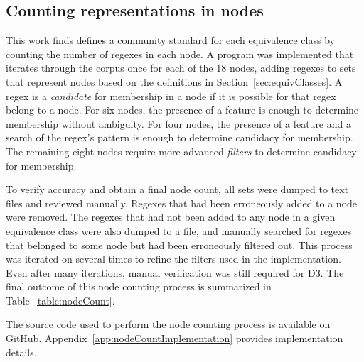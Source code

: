 \subsection{Counting representations in nodes}
\label{sec:nodeCountOverview}

This work finds defines a community standard for each equivalence class by counting the number of regexes in each node.  A program was implemented that iterates through the corpus once for each of the 18 nodes, adding regexes to sets that represent nodes based on the definitions in Section~\ref{sec:equivClasses}.  A regex is a \emph{candidate} for membership in a node if it is possible for that regex belong to a node.  For six nodes, the presence of a feature is enough to determine membership without ambiguity.  For four nodes, the presence of a feature and a search of the regex's pattern is enough to determine candidacy for membership.  The remaining eight nodes require more advanced \emph{filters} to determine candidacy for membership.

To verify accuracy and obtain a final node count, all sets were dumped to text files and reviewed manually. Regexes that had been erroneously added to a node were removed.  The regexes that had not been added to any node in a given equivalence class were also dumped to a file, and manually searched for regexes that belonged to some node but had been erroneously filtered out.  This process was iterated on several times to refine the filters used in the implementation.  Even after many iterations, manual verification was still required for D3. The final outcome of this node counting process is summarized in Table~\ref{table:nodeCount}.

The source code used to perform the node counting process is available on GitHub.  Appendix~\ref{app:nodeCountImplementation} provides implementation details.
